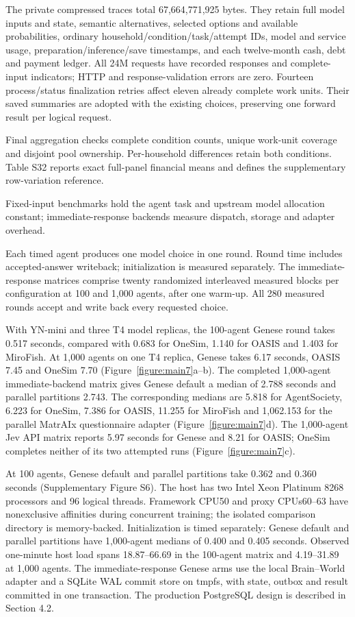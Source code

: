 \documentclass[10pt]{article}
\begin{document}
The private compressed traces total 67,664,771,925 bytes. They retain full model inputs and state, semantic alternatives, selected options and available probabilities, ordinary household/condition/task/attempt IDs, model and service usage, preparation/inference/save timestamps, and each twelve-month cash, debt and payment ledger. All 24M requests have recorded responses and complete-input indicators; HTTP and response-validation errors are zero. Fourteen process/status finalization retries affect eleven already complete work units. Their saved summaries are adopted with the existing choices, preserving one forward result per logical request.

Final aggregation checks complete condition counts, unique work-unit coverage and disjoint pool ownership. Per-household differences retain both conditions. Table S32 reports exact full-panel financial means and defines the supplementary row-variation reference.

Fixed-input benchmarks hold the agent task and upstream model allocation constant; immediate-response backends measure dispatch, storage and adapter overhead.

Each timed agent produces one model choice in one round. Round time includes accepted-answer writeback; initialization is measured separately. The immediate-response matrices comprise twenty randomized interleaved measured blocks per configuration at 100 and 1,000 agents, after one warm-up. All 280 measured rounds accept and write back every requested choice.

With YN-mini and three T4 model replicas, the 100-agent Genese round takes 0.517 seconds, compared with 0.683 for OneSim, 1.140 for OASIS and 1.403 for MiroFish. At 1,000 agents on one T4 replica, Genese takes 6.17 seconds, OASIS 7.45 and OneSim 7.70 (Figure~\ref{figure:main7}a–b). The completed 1,000-agent immediate-backend matrix gives Genese default a median of 2.788 seconds and parallel partitions 2.743. The corresponding medians are 5.818 for AgentSociety, 6.223 for OneSim, 7.386 for OASIS, 11.255 for MiroFish and 1,062.153 for the parallel MatrAIx questionnaire adapter (Figure~\ref{figure:main7}d). The 1,000-agent Jev API matrix reports 5.97 seconds for Genese and 8.21 for OASIS; OneSim completes neither of its two attempted runs (Figure~\ref{figure:main7}c).

At 100 agents, Genese default and parallel partitions take 0.362 and 0.360 seconds (Supplementary Figure S6). The host has two Intel Xeon Platinum 8268 processors and 96 logical threads. Framework CPU50 and proxy CPUs60–63 have nonexclusive affinities during concurrent training; the isolated comparison directory is memory-backed. Initialization is timed separately: Genese default and parallel partitions have 1,000-agent medians of 0.400 and 0.405 seconds. Observed one-minute host load spans 18.87–66.69 in the 100-agent matrix and 4.19–31.89 at 1,000 agents. The immediate-response Genese arms use the local Brain–World adapter and a SQLite WAL commit store on tmpfs, with state, outbox and result committed in one transaction. The production PostgreSQL design is described in Section 4.2.
\end{document}
